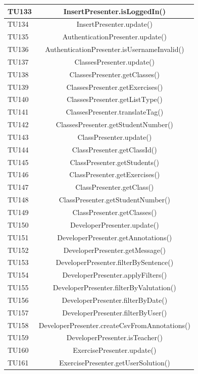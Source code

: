 \begin{longtable}{|>{\centering\arraybackslash}m{1.6cm}|c|}
		TU133 & InsertPresenter.isLoggedIn()  \\ \hline
		TU134 & InsertPresenter.update()  \\ \hline
		TU135 & AuthenticationPresenter.update() \\ \hline
		TU136 & AuthenticationPresenter.isUsernameInvalid()\\ \hline
		TU137 & ClassesPresenter.update()\\ \hline
		TU138 & ClassesPresenter.getClasses()\\ \hline
		TU139 & ClassesPresenter.getExercises()\\ \hline
		TU140 & ClassesPresenter.getListType()\\ \hline
		TU141 & ClassesPresenter.translateTag()\\ \hline
		TU142 & ClassesPresenter.getStudentNumber()\\ \hline
		TU143 & ClassPresenter.update()\\ \hline
		TU144 & ClassPresenter.getClassId()\\ \hline
		TU145 & ClassPresenter.getStudents()\\ \hline
		TU146 & ClassPresenter.getExercises()\\ \hline
		TU147 & ClassPresenter.getClass()\\ \hline
		TU148 & ClassPresenter.getStudentNumber()\\ \hline
		TU149 & ClassPresenter.getClasses()\\ \hline
		TU150 & DeveloperPresenter.update()\\ \hline
		TU151 & DeveloperPresenter.getAnnotations()\\ \hline
		TU152 & DeveloperPresenter.getMessage()\\ \hline
		TU153 & DeveloperPresenter.filterBySentence()\\ \hline
		TU154 & DeveloperPresenter.applyFilters()\\ \hline
		TU155 & DeveloperPresenter.filterByValutation()\\ \hline
		TU156 & DeveloperPresenter.filterByDate()\\ \hline
		TU157 & DeveloperPresenter.filterByUser()\\ \hline
		TU158 & DeveloperPresenter.createCsvFromAnnotations()\\ \hline
		TU159 & DeveloperPresenter.isTeacher()\\ \hline
		TU160 & ExercisePresenter.update()\\ \hline
		TU161 & ExercisePresenter.getUserSolution()\\ \hline

\end{longtable}
